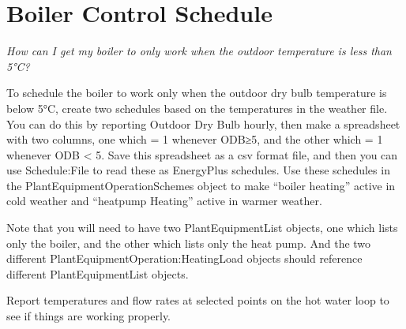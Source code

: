 \section{Boiler Control Schedule}\label{boiler-control-schedule}

\emph{How can I get my boiler to only work when the outdoor temperature is less than 5°C?}

To schedule the boiler to work only when the outdoor dry bulb temperature is below 5°C, create two schedules based on the temperatures in the weather file. You can do this by reporting Outdoor Dry Bulb hourly, then make a spreadsheet with two columns, one which = 1 whenever ODB≥5, and the other which = 1 whenever ODB \textless{} 5. Save this spreadsheet as a csv format file, and then you can use Schedule:File to read these as EnergyPlus schedules. Use these schedules in the PlantEquipmentOperationSchemes object to make ``boiler heating'' active in cold weather and ``heatpump Heating'' active in warmer weather.

Note that you will need to have two PlantEquipmentList objects, one which lists only the boiler, and the other which lists only the heat pump. And the two different PlantEquipmentOperation:HeatingLoad objects should reference different PlantEquipmentList objects.

Report temperatures and flow rates at selected points on the hot water loop to see if things are working properly.
